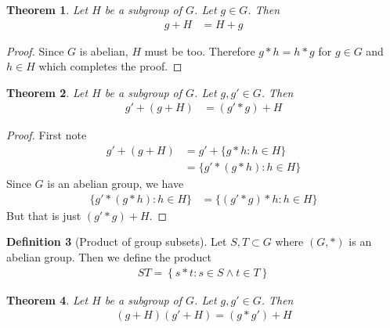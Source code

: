 \documentclass{article}
\theoremstyle{plain}
\newtheorem{theorem}{Theorem}
\theoremstyle{definition}
\newtheorem{definition}[theorem]{Definition}
\begin{document}
\begin{theorem}
	Let $H$ be a subgroup of $G$. Let $g\in G$. Then
	\begin{equation}
	\begin{aligned}
		g+H &=H+g
	\end{aligned}
	\end{equation}
\end{theorem}
\begin{proof}
	Since $G$ is abelian, $H$ must be too. Therefore $g*h=h*g$ for $g\in G$ and
	$h\in H$ which completes the proof.
\end{proof}
\begin{theorem}
	Let $H$ be a subgroup of $G$. Let $g,g'\in G$. Then
	\begin{equation}
	\begin{aligned}
		g'+(g+H) &= (g'*g)+H
	\end{aligned}
	\end{equation}
\end{theorem}
\begin{proof}
	First note	
	\begin{equation}
	\begin{aligned}
		g'+(g+H) &= g'+\{g*h:h\in H\}\\
				 &= \{g'*(g*h):h\in H\}
	\end{aligned}
	\end{equation}
	Since $G$ is an abelian group, we have
	\begin{equation}
	\begin{aligned}
		\{g'*(g*h):h\in H\} &= \{(g'*g)*h:h\in H\}
	\end{aligned}
	\end{equation}
	But that is just $(g'*g)+H$.
\end{proof}
\begin{definition}[Product of group subsets]\label{group product}
	Let $S,T\subset G$ where $(G,*)$ is an abelian group. Then we define the
	product
	\begin{equation}
	\begin{aligned}
		ST = \left\{s*t:s\in S\land t\in T\right\}
	\end{aligned}
	\end{equation}
\end{definition}
\begin{theorem}
	Let $H$ be a subgroup of $G$. Let $g,g'\in G$. Then
	\begin{equation}
	\begin{aligned}
		(g+H)(g'+H) = (g*g')+H
	\end{aligned}
	\end{equation}
\end{theorem}
\end{document}
